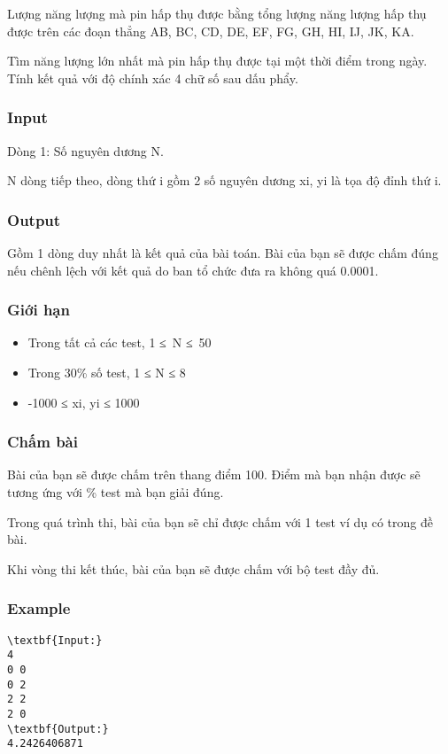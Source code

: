    Lượng năng lượng mà pin hấp thụ được bằng tổng lượng năng lượng hấp thụ được trên các đoạn thẳng AB, BC, CD, DE, EF, FG, GH, HI, IJ, JK, KA.  

   Tìm năng lượng lớn nhất mà pin hấp thụ được tại một thời điểm trong ngày. Tính kết quả với độ chính xác 4 chữ số sau dấu phẩy.  

\subsubsection{   Input  }

   Dòng 1: Số nguyên dương N.  

   N dòng tiếp theo, dòng thứ i gồm 2 số nguyên dương xi, yi là tọa độ đỉnh thứ i.  

\subsubsection{   Output  }

   Gồm 1 dòng duy nhất là kết quả của bài toán. Bài của bạn sẽ được chấm đúng nếu chênh lệch với kết quả do ban tổ chức đưa ra không quá 0.0001.  

\subsubsection{   Giới hạn  }
\begin{itemize}
	\item     Trong tất cả các test, 1 ≤ N ≤ 50   
	\item     Trong 30\% số test, 1 ≤ N ≤ 8   
	\item     -1000 ≤ xi, yi ≤ 1000   
\end{itemize}

\subsubsection{   Chấm bài  }

   Bài của bạn sẽ được chấm trên thang điểm 100. Điểm mà bạn nhận được sẽ tương ứng với \% test mà bạn giải đúng.  

   Trong quá trình thi, bài của bạn sẽ chỉ được chấm với 1 test ví dụ có trong đề bài.  

   Khi vòng thi kết thúc, bài của bạn sẽ được chấm với bộ test đầy đủ.  

\subsubsection{   Example  }
\begin{verbatim}
\textbf{Input:}
4
0 0
0 2
2 2
2 0
\textbf{Output:}
4.2426406871\end{verbatim}